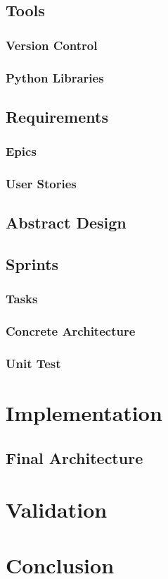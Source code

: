 \documentclass{article}
\begin{document}
\subsection{Tools}
\subsubsection{Version Control}
\subsubsection{Python Libraries}


\subsection{Requirements}
\subsubsection{Epics}
\subsubsection{User Stories}

\subsection{Abstract Design}

\subsection{Sprints}
\subsubsection{Tasks}
\subsubsection{Concrete Architecture}
\subsubsection{Unit Test}

\section{Implementation}

\subsection{Final Architecture}


\section{Validation}
\section{Conclusion}
\end{document}
